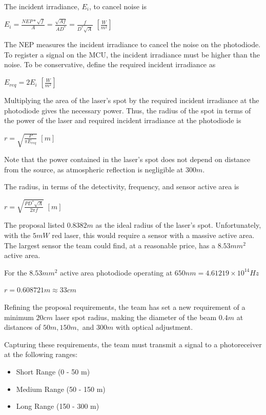 \documentclass[letterpaper,10pt]{article}
\begin{document}
\begin{spacing}{1.15}
The incident irradiance, $E_i$, to cancel noise is
\begin{center}
	{\large $E_i = \frac{NEP * \sqrt{f}}{A} = \frac{\sqrt{Af}}{AD^*} = \frac{f}{D^*\sqrt{A}}$} $[\frac{W}{m^{2}}]$
\end{center}

The NEP measures the incident irradiance to cancel the noise on the photodiode. To register a signal on the MCU, the incident irradiance must be higher than the noise. To be conservative, define the required incident irradiance as 
\begin{center}
	{\large $E_{req} = 2E_i$} $[\frac{W}{m^{2}}]$
\end{center}

Multiplying the area of the laser's spot by the required incident irradiance at the photodiode gives the necessary power. Thus, the radius of the spot in terms of the power of the laser and required incident irradiance at the photodiode is 
\begin{center}
	{\large $r = \sqrt{\frac{P}{\pi E_{req}}}$} $[m]$
\end{center}

Note that the power contained in the laser's spot does not depend on distance from the source, as atmospheric reflection is negligible at $300 m$.

The radius, in terms of the detectivity, frequency, and sensor active area is
\begin{center}
	{\large $r = \sqrt{\frac{PD^*\sqrt{A}}{2 \pi f}}$} $[m]$
\end{center}

The proposal listed $0.8382 m$ as the ideal radius of the laser's spot. Unfortunately, with the $5mW$ red laser, this would require a sensor with a massive active area. The largest sensor the team could find, at a reasonable price, has a $8.53 mm^2$ active area. 

For the $8.53 mm^2$ active area photodiode operating at $650 nm = 4.61219 × 10^{14} Hz$ 
\begin{center}
	$r = 0.608721 m \approx 33 cm$
\end{center}

Refining the proposal requirements, the team has set a new requirement of a minimum $20 cm$ laser spot radius, making the diameter of the beam $0.4m$ at distances of $50m, 150m,$ and $300m$ with optical adjustment. 

Capturing these requirements, the team must transmit a signal to a photoreceiver at the following ranges:
\begin{itemize}
	\item Short Range (0 - 50 m)
	\item Medium Range (50 - 150 m)
	\item Long Range (150 - 300 m)
\end{itemize}


\end{spacing}
\end{document}
